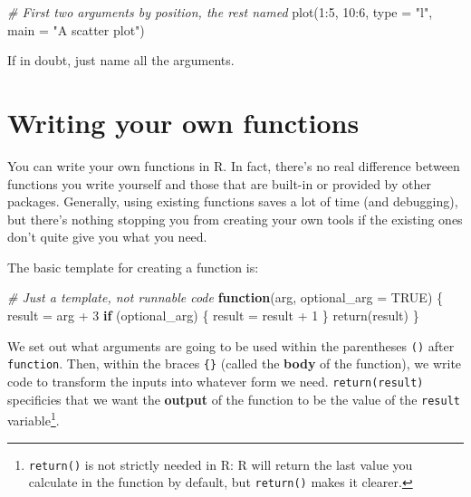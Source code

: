 \documentclass[
]{book}
\newenvironment{Shaded}{\begin{snugshade}}{\end{snugshade}}
\newcommand{\AttributeTok}[1]{\textcolor[rgb]{0.77,0.63,0.00}{#1}}
\newcommand{\CommentTok}[1]{\textcolor[rgb]{0.56,0.35,0.01}{\textit{#1}}}
\newcommand{\ConstantTok}[1]{\textcolor[rgb]{0.00,0.00,0.00}{#1}}
\newcommand{\ControlFlowTok}[1]{\textcolor[rgb]{0.13,0.29,0.53}{\textbf{#1}}}
\newcommand{\DecValTok}[1]{\textcolor[rgb]{0.00,0.00,0.81}{#1}}
\newcommand{\FunctionTok}[1]{\textcolor[rgb]{0.00,0.00,0.00}{#1}}
\newcommand{\NormalTok}[1]{#1}
\newcommand{\OtherTok}[1]{\textcolor[rgb]{0.56,0.35,0.01}{#1}}
\newcommand{\SpecialCharTok}[1]{\textcolor[rgb]{0.00,0.00,0.00}{#1}}
\newcommand{\StringTok}[1]{\textcolor[rgb]{0.31,0.60,0.02}{#1}}
\begin{document}
\begin{Shaded}
\begin{Highlighting}[]
\CommentTok{\# First two arguments by position, the rest named}
\FunctionTok{plot}\NormalTok{(}\DecValTok{1}\SpecialCharTok{:}\DecValTok{5}\NormalTok{, }\DecValTok{10}\SpecialCharTok{:}\DecValTok{6}\NormalTok{, }\AttributeTok{type =} \StringTok{"l"}\NormalTok{, }\AttributeTok{main =} \StringTok{"A scatter plot"}\NormalTok{)}
\end{Highlighting}
\end{Shaded}

If in doubt, just name all the arguments.

\hypertarget{writing-your-own-functions}{%
\section{Writing your own functions}\label{writing-your-own-functions}}

You can write your own functions in R. In fact, there's no real difference
between functions you write yourself and those that are built-in or provided
by other packages. Generally, using existing functions saves a lot of time
(and debugging), but there's nothing stopping you from creating your
own tools if the existing ones don't quite give you what you need.

The basic template for creating a function is:

\begin{Shaded}
\begin{Highlighting}[]
\CommentTok{\# Just a template, not runnable code}
\ControlFlowTok{function}\NormalTok{(arg, }\AttributeTok{optional\_arg =} \ConstantTok{TRUE}\NormalTok{) \{}
\NormalTok{   result }\OtherTok{=}\NormalTok{ arg }\SpecialCharTok{+} \DecValTok{3} 
   \ControlFlowTok{if}\NormalTok{ (optional\_arg) \{}
\NormalTok{       result }\OtherTok{=}\NormalTok{ result }\SpecialCharTok{+} \DecValTok{1}
\NormalTok{   \}}
   \FunctionTok{return}\NormalTok{(result)}
\NormalTok{\}}
\end{Highlighting}
\end{Shaded}

We set out what arguments are going to be used within the parentheses \texttt{()} after
\texttt{function}. Then, within the braces \texttt{\{\}} (called the \textbf{body} of the function),
we write code to transform the inputs into whatever form we need.
\texttt{return(result)} specificies that we want the \textbf{output} of the function to
be the value of the \texttt{result} variable\footnote{\texttt{return()} is not strictly needed in R: R will return
  the last value you calculate in the function by default, but \texttt{return()}
  makes it clearer.}.
\end{document}
